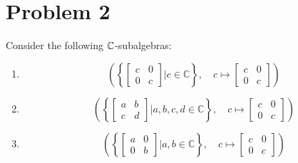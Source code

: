 \documentclass[12pt]{article}
\begin{document}
\pagebreak

\section{Problem 2}

Consider the following $\mathbb{C}$-subalgebras:
\begin{enumerate}
  \item \[
          \left(
          \left\{
          \begin{bmatrix}
            c & 0 \\
            0 & c
          \end{bmatrix}
          \mathrel{\Big|} c \in \mathbb{C}
          \right\},
          \quad
          c \mapsto
          \begin{bmatrix}
            c & 0 \\
            0 & c
          \end{bmatrix}
          \right)
        \]

  \item \[
          \left(
          \left\{
          \begin{bmatrix}
            a & b \\
            c & d
          \end{bmatrix}
          \mathrel{\Big|} a,b,c,d \in \mathbb{C}
          \right\},
          \quad
          c \mapsto
          \begin{bmatrix}
            c & 0 \\
            0 & c
          \end{bmatrix}
          \right)
        \]

  \item \[
          \left(
          \left\{
          \begin{bmatrix}
            a & 0 \\
            0 & b
          \end{bmatrix}
          \mathrel{\Big|} a,b \in \mathbb{C}
          \right\},
          \quad
          c \mapsto
          \begin{bmatrix}
            c & 0 \\
            0 & c
          \end{bmatrix}
          \right)
        \]


\end{enumerate}
\end{document}
